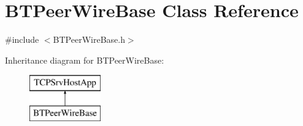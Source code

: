 \hypertarget{classBTPeerWireBase}{}\section{B\+T\+Peer\+Wire\+Base Class Reference}
\label{classBTPeerWireBase}


{\ttfamily \#include $<$B\+T\+Peer\+Wire\+Base.\+h$>$}

Inheritance diagram for B\+T\+Peer\+Wire\+Base\+:\begin{figure}[H]
\begin{center}
\leavevmode
\includegraphics[height=2.000000cm]{classBTPeerWireBase}
\end{center}
\end{figure}
